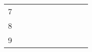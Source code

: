 \begin{table}[ht]
\begin{tabular}{c|lllllllll}
    7                                                                                                          &                                                                              &                                                          &                                                           &                                                                &                                                                  &                                                                                                                 &                                                                                                                &                                                                                                                                &                                                            \\
    8                                                                                                          &                                                                              &                                                          &                                                           &                                                                &                                                                  &                                                                                                                 &                                                                                                                &                                                                                                                                &                                                            \\
    9                                                                                                          &                                                                              &                                                          &                                                           &                                                                &                                                                  &                                                                                                                 &                                                                                                                &                                                                                                                                &                                                            \\

\end{tabular}
\end{table}
